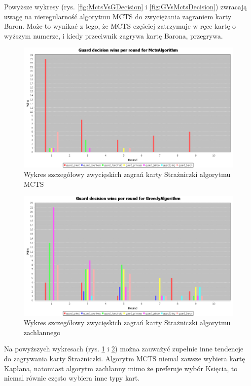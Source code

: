 Powyższe wykresy (rys. \ref{fig:MctsVsGDecision} i \ref{fig:GVsMctsDecision}) zwracają uwagę na nieregularność algorytmu MCTS do zwyciężania zagraniem karty Baron. Może to wynikać z tego, że MCTS częściej zatrzymuje w ręce kartę o wyższym numerze, i kiedy przeciwnik zagrywa kartę Barona, przegrywa.

\begin{figure}[H]
	\centering
	\includegraphics[width=\textwidth]{Resources/MirrorMctsVg/MctsVsGGuardDecision.PNG}
	\caption{Wykres szczegółowy zwycięskich zagrań karty Strażniczki algorytmu MCTS} 
	\label{fig:MctsVsGGuardDecision}
\end{figure}

\begin{figure}[H]
	\centering
	\includegraphics[width=\textwidth]{Resources/MirrorMctsVg/GVsMctsGuardDecision.PNG}
	\caption{Wykres szczegółowy zwycięskich zagrań karty Strażniczki algorytmu zachłannego} 
	\label{fig:GVsMctsGuardDecision}
\end{figure}

Na powyższych wykresach (rys. \ref{fig:MctsVsGGuardDecision} i \ref{fig:GVsMctsGuardDecision}) można zauważyć zupełnie inne tendencje do zagrywania karty Strażniczki. Algorytm MCTS niemal zawsze wybiera kartę Kapłana, natomiast algorytm zachłanny mimo że preferuje wybór Księcia, to niemal równie często wybiera inne typy kart.


